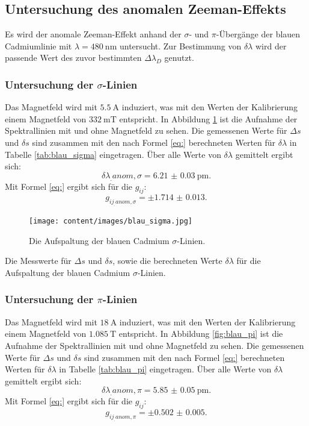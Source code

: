\subsection{Untersuchung des anomalen Zeeman-Effekts}

Es wird der anomale Zeeman-Effekt anhand der $\sigma$- und $\pi$-Übergänge der blauen Cadmiumlinie mit $\lambda=\SI{480}{\nano\metre}$ untersucht. Zur Bestimmung von $\delta\lambda$ wird der passende Wert des zuvor bestimmten $\Delta\lambda_D$ genutzt. 

\subsubsection{Untersuchung der $\sigma$-Linien}

Das Magnetfeld wird mit $\SI{5.5}{\ampere}$ induziert, was mit den Werten der Kalibrierung einem Magnetfeld von $\SI{332}{\milli\tesla}$ entspricht. In Abbildung \ref{fig:blau_sigma} ist die Aufnahme der Spektrallinien mit und ohne Magnetfeld zu sehen. Die gemessenen Werte für $\Delta s$ und $\delta s$ sind zusammen mit den nach Formel \eqref{eq:} berechneten Werten für $\delta\lambda$ in Tabelle \ref{tab:blau_sigma} eingetragen.
Über alle Werte von $\delta\lambda$ gemittelt ergibt sich:
\[
\delta\lambda_.{anom,\sigma} = \SI{6.21(3)}{\pico\metre}\text{.}
\]
Mit Formel \eqref{eq:} ergibt sich für die $g_{ij}$:
\[
g_{ij_.{anom,\sigma}} = \pm\num{1.714(13)}\text{.}
\]

\begin{figure}
	\centering
	\texttt{[image: content/images/blau\_sigma.jpg]}
	\caption{Die Aufspaltung der blauen Cadmium $\sigma$-Linien.}
	\label{fig:blau_sigma}
\end{figure}

\begin{table}
	\centering
	\caption{Die Messwerte für $\Delta s$ und $\delta s$, sowie die berechneten Werte $\delta\lambda$ für die Aufspaltung der blauen Cadmium $\sigma$-Linien.}
	
	\label{tab:blau_sigma}
\end{table}

\subsubsection{Untersuchung der $\pi$-Linien}

Das Magnetfeld wird mit $\SI{18}{\ampere}$ induziert, was mit den Werten der Kalibrierung einem Magnetfeld von $\SI{1.085}{\tesla}$ entspricht. In Abbildung \ref{fig:blau_pi} ist die Aufnahme der Spektrallinien mit und ohne Magnetfeld zu sehen. Die gemessenen Werte für $\Delta s$ und $\delta s$ sind zusammen mit den nach Formel \eqref{eq:} berechneten Werten für $\delta\lambda$ in Tabelle \ref{tab:blau_pi} eingetragen.
Über alle Werte von $\delta\lambda$ gemittelt ergibt sich:
\[
\delta\lambda_.{anom,\pi} = \SI{5.85(5)}{\pico\metre}\text{.}
\]
Mit Formel \eqref{eq:} ergibt sich für die $g_{ij}$:
\[
g_{ij_.{anom,\pi}} = \pm\num{0.502(5)}\text{.}
\]

